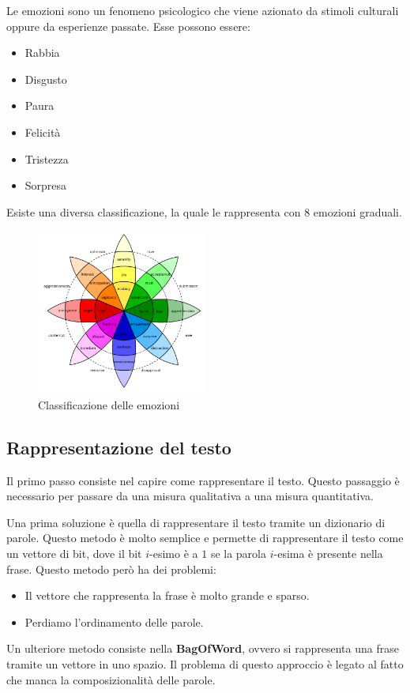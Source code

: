 \begin{definizione}
      Le emozioni sono un fenomeno psicologico che viene azionato da stimoli
      culturali oppure da esperienze passate. Esse possono essere:
      \begin{itemize}
            \item Rabbia
            \item Disgusto
            \item Paura
            \item Felicità
            \item Tristezza
            \item Sorpresa
      \end{itemize}
      Esiste una diversa classificazione, la quale le rappresenta con 8 emozioni
      graduali.
      \begin{figure}[!ht]
            \centering
            \includegraphics[width=0.5\textwidth]{./img/nlp/emozioni.png}
            \caption{Classificazione delle emozioni}
            \label{fig:emozioni}
      \end{figure}
\end{definizione}
\subsection{Rappresentazione del testo}
Il primo passo consiste nel capire come rappresentare il testo. Questo passaggio
è necessario per passare da una misura qualitativa a una misura quantitativa.

Una prima soluzione è quella di rappresentare il testo tramite un dizionario
di parole. Questo metodo è molto semplice e permette di rappresentare il testo
come un vettore di bit, dove il bit $i$-esimo è a $1$ se la parola $i$-esima
è presente nella frase. Questo metodo però ha dei problemi:
\begin{itemize}
      \item Il vettore che rappresenta la frase è molto grande e sparso.
      \item Perdiamo l'ordinamento delle parole.
\end{itemize}
Un ulteriore metodo consiste nella \textbf{BagOfWord}, ovvero si rappresenta una
frase tramite un vettore in uno spazio. Il problema di questo approccio è legato
al fatto che manca la composizionalità delle parole.

